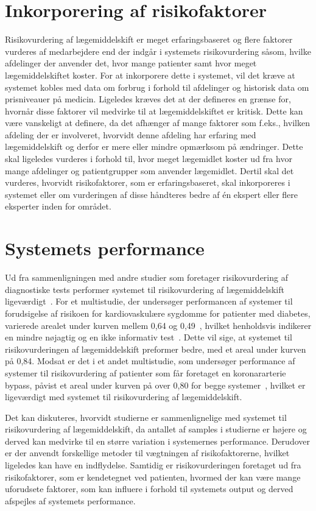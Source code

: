\section{Inkorporering af risikofaktorer}
Risikovurdering af lægemiddelskift er meget erfaringsbaseret og flere faktorer vurderes af medarbejdere end der indgår i systemets risikovurdering såsom, hvilke afdelinger der anvender det, hvor mange patienter samt hvor meget lægemiddelskiftet koster. For at inkorporere dette i systemet, vil det kræve at systemet kobles med data om forbrug i forhold til afdelinger og historisk data om prisniveauer på medicin. Ligeledes kræves det at der defineres en grænse for, hvornår disse faktorer vil medvirke til at lægemiddelskiftet er kritisk. Dette kan være vanskeligt at definere, da det afhænger af mange faktorer som f.eks., hvilken afdeling der er involveret, hvorvidt denne afdeling har erfaring med lægemiddelskift og derfor er mere eller mindre opmærksom på ændringer. Dette skal ligeledes vurderes i forhold til, hvor meget lægemidlet koster ud fra hvor mange afdelinger og patientgrupper som anvender lægemidlet. Dertil skal det vurderes, hvorvidt risikofaktorer, som er erfaringsbaseret, skal inkorporeres i systemet eller om vurderingen af disse håndteres bedre af én ekspert eller flere eksperter inden for området.

\section{Systemets performance}
Ud fra sammenligningen med andre studier som foretager risikovurdering af diagnostiske tests performer systemet til risikovurdering af lægemiddelskift ligeværdigt~\citep{Chan2009,VanStraten2010}. For et multistudie, der undersøger performancen af systemer til forudsigelse af risikoen for kardiovaskulære sygdomme for patienter med diabetes, varierede arealet under kurven mellem 0,64 og 0,49~\citep{Chan2009}, hvilket henholdsvis indikerer en mindre nøjagtig og en ikke informativ test~\citep{Greiner2000}. Dette vil sige, at systemet til risikovurderingen af lægemiddelskift preformer bedre, med et areal under kurven på 0,84. Modsat er det i et andet multistudie, som undersøger performance af systemer til risikovurdering af patienter som får foretaget en koronararterie bypass, påvist et areal under kurven på over 0,80 for begge systemer~\citep{VanStraten2010}, hvilket er ligeværdigt med systemet til risikovurdering af lægemiddelskift.

Det kan diskuteres, hvorvidt studierne er sammenlignelige med systemet til risikovurdering af lægemiddelskift, da antallet af samples i studierne er 
højere og derved kan medvirke til en større variation i systemernes performance. Derudover er der anvendt forskellige metoder til vægtningen af risikofaktorerne, hvilket ligeledes kan have en indflydelse. Samtidig er risikovurderingen foretaget ud fra risikofaktorer, som er kendetegnet ved patienten, hvormed der kan være mange uforudsete faktorer, som kan influere i forhold til systemets output og derved afspejles af systemets performance. 

